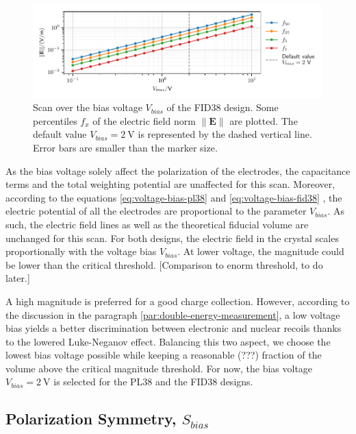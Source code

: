 \begin{figure}
\centering
\includegraphics[scale=1]{Figures/ElectrodesScan/capacitance_fiducial_V_bias.pdf}
\caption{Scan over the bias voltage $V_{bias}$ of the FID38 design. Some percentiles $f_x$ of the electric field norm $\| \mathbf{E} \|$ are plotted. The default value $V_{bias}=\SI{2}{\volt}$ is represented by the dashed vertical line. Error bars are smaller than the marker size.}
\label{fig:capacitance-fiducial-V-bias-pl38}
\end{figure}

As the bias voltage solely affect the polarization of the electrodes, the capacitance terms and the total weighting potential are unaffected for this scan. Moreover, according to the equations \ref{eq:voltage-bias-pl38} and \ref{eq:voltage-bias-fid38} , the electric potential of all the electrodes are proportional to the parameter $V_{bias}$. As such, the electric field lines as well as the theoretical fiducial volume are unchanged for this scan. 
For both designs, the electric field in the crystal scales proportionally with the voltage bias $V_{bias}$. At lower voltage, the magnitude could be lower than the critical threshold.
{\color{red} [Comparison to enorm threshold, to do later.]}

A high magnitude is preferred for a good charge collection. However, according to the discussion in the paragraph \ref{par:double-energy-measurement}, a low voltage bias yields a better discrimination between electronic and nuclear recoils thanks to the lowered Luke-Neganov effect. Balancing this two aspect, we choose the lowest bias voltage possible while keeping a reasonable (???) fraction of the volume above the critical magnitude threshold. For now, the bias voltage $V_{bias} = \SI{2}{\volt}$ is selected for the PL38 and the FID38 designs.


\subsection{Polarization Symmetry, $S_{bias}$}

